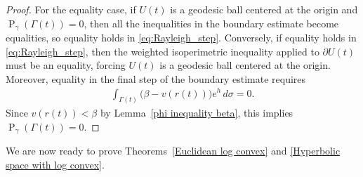 \documentclass[11pt,leqno]{amsart}
\numberwithin{equation}{section}
\begin{document}
\begin{proof}
For the equality case, if $U(t)$ is a geodesic ball centered at the origin and $\operatorname{P}_{\gamma}(\Gamma(t))=0$, then all the inequalities in the boundary estimate  become equalities, so equality holds in \eqref{eq:Rayleigh_step}. Conversely, if equality holds in \eqref{eq:Rayleigh_step}, then the weighted isoperimetric inequality applied to $\partial U(t)$ must be an equality, forcing $U(t)$ is a geodesic ball centered at the origin. Moreover, equality in the final step of the boundary estimate requires 
\begin{align*}
\int_{\Gamma(t)} \big(\beta - v(r(t))\big) e^{h}\,d\sigma = 0.
\end{align*}
Since $v(r(t)) < \beta$ by Lemma~\ref{phi inequality beta}, this implies $\operatorname{P}_{\gamma}(\Gamma(t))=0$.
\end{proof}

We are now ready to prove Theorems~\ref{Euclidean log convex} and \ref{Hyperbolic space with log convex}.
\end{document}

